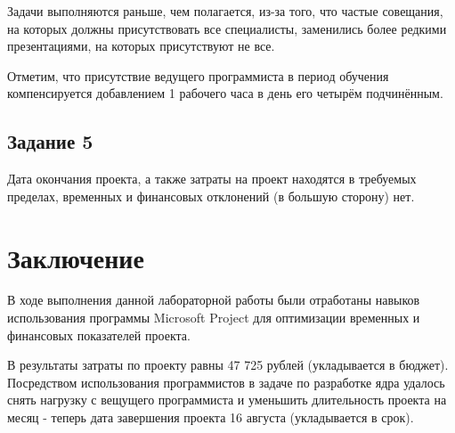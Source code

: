 Задачи выполняются раньше, чем полагается, из-за того, что частые совещания, на которых должны присутствовать все специалисты, заменились более редкими презентациями, на которых присутствуют не все. 

Отметим, что присутствие ведущего программиста в период обучения компенсируется добавлением 1 рабочего часа в день его четырём подчинённым.

\subsection*{Задание 5}

Дата окончания проекта, а также затраты на проект находятся в требуемых пределах, временных и финансовых отклонений (в большую сторону) нет.

\section*{Заключение}

В ходе выполнения данной лабораторной работы были отработаны навыков использования программы Microsoft Project для оптимизации временных и финансовых показателей проекта.

В результаты затраты по проекту равны 47 725 рублей (укладывается в бюджет).
Посредством использования программистов в задаче по разработке ядра удалось снять нагрузку с вещущего программиста и уменьшить длительность проекта на месяц - теперь дата завершения проекта 16 августа (укладывается в срок).